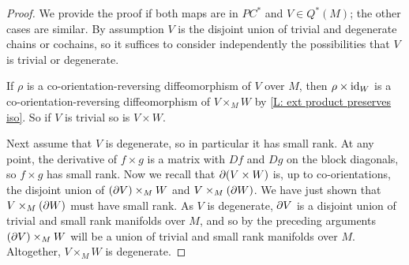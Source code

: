 \begin{proof}
	We provide the proof if both maps are in $PC^*$ and $V \in Q^*(M)$; the other cases are similar.
	By assumption $V$ is the disjoint union of trivial and degenerate chains or cochains, so it suffices to consider independently the possibilities that $V$ is trivial or degenerate.

	If $\rho$ is a co-orientation-reversing diffeomorphism of $V$ over $M$, then $\rho \times \mathrm{id}_W$ is a co-orientation-reversing diffeomorphism of $V \times_M W$ by \cref{L: ext product preserves iso}.
	So if $V$ is trivial so is $V \times W$.

	Next assume that $V$ is degenerate, so in particular it has small rank.
	At any point, the derivative of $f \times g$ is a matrix with $Df$ and $Dg$ on the block diagonals, so $f \times g$ has small rank.
	Now we recall that $\partial(V \times W)$ is, up to co-orientations, the disjoint union of $(\partial V) \times_M W$ and $V \times_M (\partial W)$.
	We have just shown that $V \times_M (\partial W)$ must have small rank.
	As $V$ is degenerate, $\partial V$ is a disjoint union of trivial and small rank manifolds over $M$, and so by the preceding arguments $(\partial V) \times_M W$ will be a union of trivial and small rank manifolds over $M$.
	Altogether, $V \times_M W$ is degenerate.
\end{proof}



